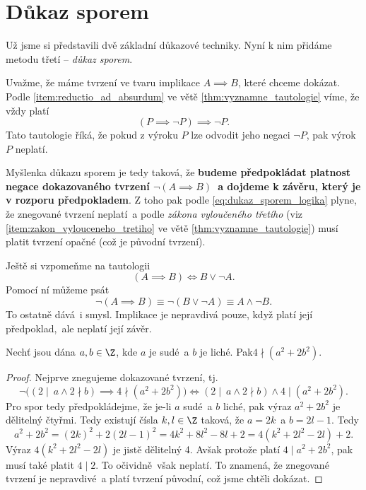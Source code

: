 \section{Důkaz sporem}\label{sec:dukaz_sporem}
Už jsme si představili dvě základní důkazové techniky. Nyní k nim přidáme metodu třetí -- \emph{důkaz sporem}.\par
Uvažme, že máme tvrzení ve tvaru implikace $A \implies B$, které chceme dokázat. Podle \ref{item:reductio_ad_absurdum} ve větě \ref{thm:vyznamne_tautologie} víme, že vždy platí
\begin{equation}\label{eq:dukaz_sporem_logika}
    (P \implies \neg P) \implies \neg P.
\end{equation}
Tato tautologie říká, že pokud z výroku $P$ lze odvodit jeho negaci $\neg P$, pak výrok $P$ neplatí.\par
Myšlenka důkazu sporem je tedy taková, že \textbf{budeme předpokládat platnost negace dokazovaného tvrzení $\neg (A \implies B)$~a dojdeme k závěru, který je v rozporu předpokladem}. Z toho pak podle \eqref{eq:dukaz_sporem_logika} plyne, že znegované tvrzení neplatí~a podle \emph{zákona vyloučeného třetího} (viz \ref{item:zakon_vylouceneho_tretiho} ve větě \ref{thm:vyznamne_tautologie}) musí platit tvrzení opačné (což je původní tvrzení).\par
Ještě si vzpomeňme na tautologii
\begin{equation*}
    (A \implies B) \iff B \lor \neg A.
\end{equation*}
Pomocí ní můžeme psát
\begin{equation*}
    \neg (A \implies B) \equiv \neg (B \lor \neg A) \equiv A \land \neg B.
\end{equation*}
To ostatně dává~i smysl. Implikace je nepravdivá pouze, když platí její předpoklad,~ale neplatí její závěr.
\begin{proposition}
    Nechť jsou dána $a,b\in\Z$, kde $a$ je sudé~a $b$ je liché. Pak\linebreak $4 \nmid (a^2+2b^2)$.
\end{proposition}
\begin{proof}
    Nejprve znegujeme dokazované tvrzení, tj.
    \begin{equation*}
        \neg \bigl((2 \mid~a \land 2 \nmid b) \implies 4 \nmid (a^2+2b^2)\bigr) \iff (2 \mid~a \land 2 \nmid b) \land 4 \mid (a^2+2b^2).
    \end{equation*}
    Pro spor tedy předpokládejme, že je-li $a$ sudé~a $b$ liché, pak výraz $a^2+2b^2$ je dělitelný čtyřmi. Tedy existují čísla $k,l\in\Z$ taková, že $a=2k$~a $b=2l-1$. Tedy
    \begin{equation*}
        a^2+2b^2=(2k)^2+2(2l-1)^2=4k^2+8l^2-8l+2=4(k^2+2l^2-2l)+2.
    \end{equation*}
    Výraz $4(k^2+2l^2-2l)$ je jistě dělitelný 4. Avšak protože platí $4 \mid a^2+2b^2$, pak musí také platit $4 \mid 2$. To očividně~však neplatí. To znamená, že znegované tvrzení je nepravdivé~a platí tvrzení původní, což jsme chtěli dokázat.
\end{proof}
